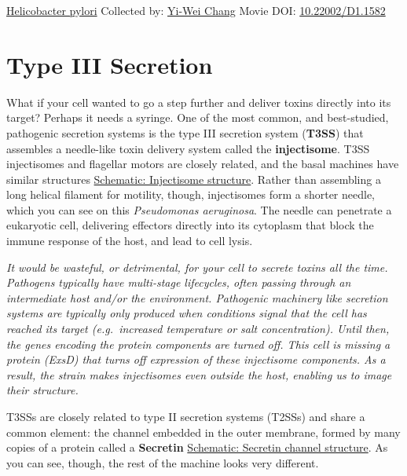 \documentclass[]{tufte-book}
\begin{document}
\hypertarget{htmlwidget-f05c33d75fb6d1610897}{}

\label{fig:9-3a}\protect\hyperlink{tree}{Helicobacter pylori} Collected by: \protect\hyperlink{yi-wei_chang}{Yi-Wei Chang} Movie DOI: \href{https://doi.org/10.22002/D1.1582}{10.22002/D1.1582}

\hypertarget{type-iii-secretion}{%
\section{Type III Secretion}\label{type-iii-secretion}}

What if your cell wanted to go a step further and deliver toxins directly into its target? Perhaps it needs a syringe. One of the most common, and best-studied, pathogenic secretion systems is the type III secretion system (\textbf{T3SS}) that assembles a needle-like toxin delivery system called the \textbf{injectisome}. T3SS injectisomes and flagellar motors are closely related, and the basal machines have similar structures \protect\hyperlink{Injectisome_structure}{Schematic: Injectisome structure}. Rather than assembling a long helical filament for motility, though, injectisomes form a shorter needle, which you can see on this \emph{Pseudomonas aeruginosa}. The needle can penetrate a eukaryotic cell, delivering effectors directly into its cytoplasm that block the immune response of the host, and lead to cell lysis.

\emph{It would be wasteful, or detrimental, for your cell to secrete toxins all the time. Pathogens typically have multi-stage lifecycles, often passing through an intermediate host and/or the environment. Pathogenic machinery like secretion systems are typically only produced when conditions signal that the cell has reached its target (e.g.~increased temperature or salt concentration). Until then, the genes encoding the protein components are turned off. This cell is missing a protein (ExsD) that turns off expression of these injectisome components. As a result, the strain makes injectisomes even outside the host, enabling us to image their structure.}

T3SSs are closely related to type II secretion systems (T2SSs) and share a common element: the channel embedded in the outer membrane, formed by many copies of a protein called a \textbf{Secretin} \protect\hyperlink{Secretin_channel_structure}{Schematic: Secretin channel structure}. As you can see, though, the rest of the machine looks very different.
\end{document}
